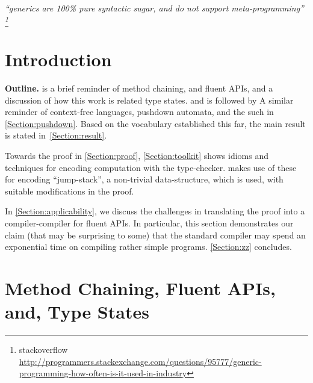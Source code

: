 \documentclass[a4paper,USenglish]{lipics}
\author{Anonymized for the submission}
\begin{document}
\maketitle
\hfill
  \parbox{40ex}{%
    \begin{flushright}
    \scriptsize\itshape ``\protect \Java   generics are 100\protect\% pure syntactic sugar,
    and do not support meta-programming''%
\footnote{%
      stackoverflow
      \tiny
       \url{http://programmers.stackexchange.com/questions/95777/generic-programming-how-often-is-it-used-in-industry}
    }
    \end{flushright}
  }
\newline

\begin{abstract}
  
\end{abstract}

\section{Introduction}


\textbf{Outline.}
 is a brief reminder of method chaining, 
  and fluent APIs, and a discussion of how this work is related type states. 
  and is followed by 
A similar reminder of context-free languages, pushdown automata, 
  and the such in \cref{Section:pushdown}.
Based on the vocabulary established this far, 
  the main result is stated in~\cref{Section:result}.

Towards the proof in \cref{Section:proof}, \cref{Section:toolkit} 
  shows idioms and techniques for encoding computation with    
  the \Java type-checker.
 makes use of these for encoding 
  ``jump-stack'', a non-trivial data-structure,
  which is used, with suitable modifications in the proof. 

In \cref{Section:applicability}, we discuss the challenges in
  translating the proof into a compiler-compiler for fluent APIs.
In particular, this section demonstrates our claim (that may be
  surprising to some) that the standard \Java compiler may spend
  an exponential time on compiling rather simple programs.
\cref{Section:zz} concludes.

  
\section{Method Chaining, Fluent APIs, and, Type States}
\label{Section:fluent}

\end{document}
